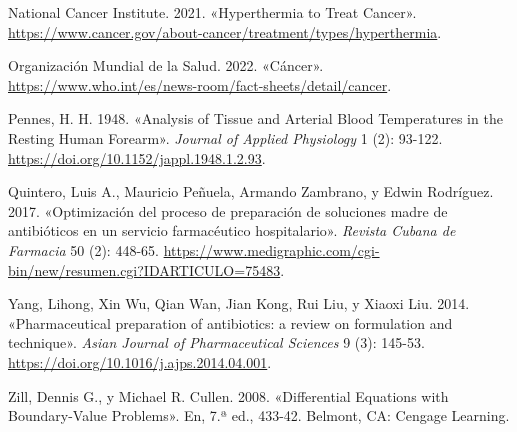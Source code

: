 \documentclass[
  spanish,
  us-letterpaper,
  DIV=11,
  numbers=noendperiod]{scrreprt}
\newlength{\cslhangindent}
\newenvironment{CSLReferences}[2] %
 {\begin{list}{}{%
  \setlength{\itemindent}{0pt}
  \setlength{\leftmargin}{0pt}
  \setlength{\parsep}{0pt}
  \ifodd #1
   \setlength{\leftmargin}{\cslhangindent}
   \setlength{\itemindent}{-1\cslhangindent}
  \fi
  \setlength{\itemsep}{#2\baselineskip}}}
 {\end{list}}
\theoremstyle{definition}
\theoremstyle{plain}
\theoremstyle{remark}
\begin{document}
\begin{CSLReferences}{1}{0}
National Cancer Institute. 2021. {«{Hyperthermia to Treat Cancer}»}.
\url{https://www.cancer.gov/about-cancer/treatment/types/hyperthermia}.

Organización Mundial de la Salud. 2022. {«{Cáncer}»}.
\url{https://www.who.int/es/news-room/fact-sheets/detail/cancer}.

Pennes, H. H. 1948. {«Analysis of Tissue and Arterial Blood Temperatures
in the Resting Human Forearm»}. \emph{Journal of Applied Physiology} 1
(2): 93-122. \url{https://doi.org/10.1152/jappl.1948.1.2.93}.

Quintero, Luis A., Mauricio Peñuela, Armando Zambrano, y Edwin
Rodríguez. 2017. {«Optimización del proceso de preparación de soluciones
madre de antibióticos en un servicio farmacéutico hospitalario»}.
\emph{Revista Cubana de Farmacia} 50 (2): 448-65.
\url{https://www.medigraphic.com/cgi-bin/new/resumen.cgi?IDARTICULO=75483}.

Yang, Lihong, Xin Wu, Qian Wan, Jian Kong, Rui Liu, y Xiaoxi Liu. 2014.
{«Pharmaceutical preparation of antibiotics: a review on formulation and
technique»}. \emph{Asian Journal of Pharmaceutical Sciences} 9 (3):
145-53. \url{https://doi.org/10.1016/j.ajps.2014.04.001}.

Zill, Dennis G., y Michael R. Cullen. 2008. {«Differential Equations
with Boundary-Value Problems»}. En, 7.ª ed., 433-42. Belmont, CA:
Cengage Learning.

\end{CSLReferences}
\end{document}
